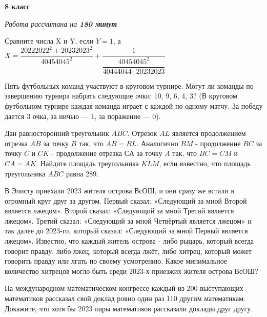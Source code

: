 \hspace{3mm}

\centerline{\bf \huge 8 класс}
\centerline{\normalsize{\it Работа рассчитана на \bf{180} минут}}

\hspace{3mm}


Сравните числа X и Y, если $Y = 1 $, а $X = \dfrac{20222022^2+20232023^2}{40454045^2} + \dfrac{1}{\dfrac{40454045^2}{40444044\cdot20232023}}$

\hspace{3mm}

Пять футбольных команд участвуют в круговом турнире. Могут ли команды по завершению турнира набрать следующие очки: 10, 9, 6, 4, 3? (В круговом футбольном турнире каждая команда играет с каждой по одному матчу. За победу дается 3 очка, за ничью — 1, за поражение — 0).

\hspace{3mm}

Дан равносторонний треугольник $ABC$. Отрезок $AL$ является продолжением отрезка $AB$ за точку $B$ так, что $AB = BL$. Аналогично $BM$ - продолжение $BC$ за точку $C$ и $CK$ - продолжение отрезка $СА$ за точку $A$ так, что $BC = CM$ и $CA = AK$. Найдите площадь треугольника $KLM$, если известно, что площадь треугольника $ABC$ равна 289.

\hspace{3mm}

В Элисту приехали 2023 жителя острова ВсОШ, и они сразу же встали в огромный круг друг за другом. Первый сказал: «Следующий за мной Второй является лжецом». Второй сказал: «Следующий за мной Третий является лжецом». Третий сказал: «Следующий за мной Четвёртый является лжецом» и так далее до 2023-го, который сказал: «Следующий за мной Первый является лжецом». Известно, что каждый житель острова - либо рыцарь, который всегда говорит правду, либо лжец, который всегда лжёт, либо хитрец, который может говорить правду или лгать по своему усмотрению. Какое минимальное количество хитрецов могло быть среди 2023-х приезжих жителя острова ВсОШ? 

\hspace{3mm}

На международном математическом конгрессе каждый из 200 выступающих математиков рассказал свой доклад ровно один раз 110 другим математикам. Докажите, что хотя бы 2023 пары математиков рассказали доклады друг другу.


